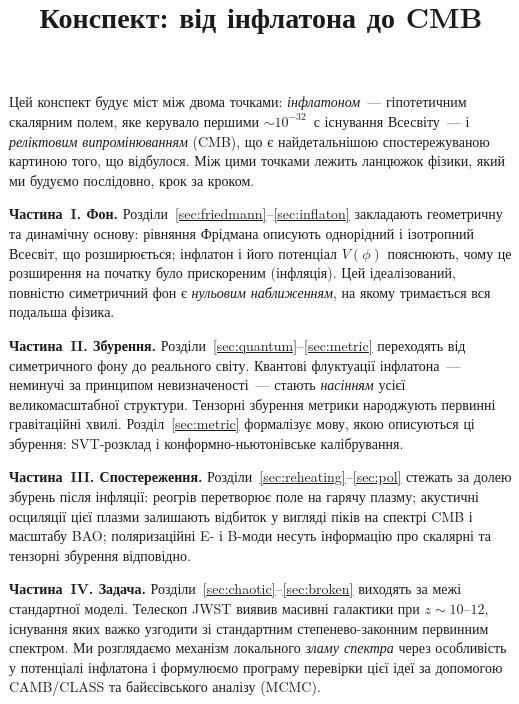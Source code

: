 \documentclass[12pt, a4paper]{article}
\title{\bfseries Конспект: від інфлатона до CMB}
\author{}
\date{}
\begin{document}
\maketitle
\tableofcontents
\newpage


Цей конспект будує міст між двома точками: \emph{інфлатоном}~---
гіпотетичним скалярним полем, яке керувало першими
${\sim}10^{-32}$~с існування Всесвіту~--- і \emph{реліктовим випромінюванням} (CMB),
що є найдетальнішою спостережуваною картиною того, що відбулося.
Між цими точками лежить ланцюжок фізики, який ми будуємо
послідовно, крок за кроком.

\textbf{Частина~I. Фон.} Розділи~\ref{sec:friedmann}–\ref{sec:inflaton}
закладають геометричну та динамічну основу: рівняння Фрідмана описують
однорідний і ізотропний Всесвіт, що розширюється; інфлатон і його
потенціал $V(\phi)$ пояснюють, чому це розширення на початку було
прискореним (інфляція). Цей ідеалізований, повністю симетричний фон є
\emph{нульовим наближенням}, на якому тримається вся подальша фізика.

\textbf{Частина~II. Збурення.} Розділи~\ref{sec:quantum}–\ref{sec:metric}
переходять від симетричного фону до реального світу. Квантові флуктуації
інфлатона~--- неминучі за принципом невизначеності~--- стають
\emph{насінням} усієї великомасштабної структури. Тензорні збурення
метрики народжують первинні гравітаційні хвилі. Розділ~\ref{sec:metric}
формалізує мову, якою описуються ці збурення: SVT-розклад і
конформно-ньютонівське калібрування.

\textbf{Частина~III. Спостереження.} Розділи~\ref{sec:reheating}–\ref{sec:pol}
стежать за долею збурень після інфляції: реогрів перетворює поле на
гарячу плазму; акустичні осциляції цієї плазми залишають відбиток у
вигляді піків на спектрі CMB і масштабу BAO; поляризаційні E- і B-моди
несуть інформацію про скалярні та тензорні збурення відповідно.

\textbf{Частина~IV. Задача.} Розділи~\ref{sec:chaotic}–\ref{sec:broken}
виходять за межі стандартної моделі. Телескоп JWST виявив масивні
галактики при $z \sim 10$–$12$, існування яких важко узгодити зі
стандартним степенево-законним первинним спектром. Ми розглядаємо
механізм локального \emph{зламу спектра} через особливість у потенціалі
інфлатона і формулюємо програму перевірки цієї ідеї за допомогою
CAMB/CLASS та байєсівського аналізу (MCMC).
\end{document}
